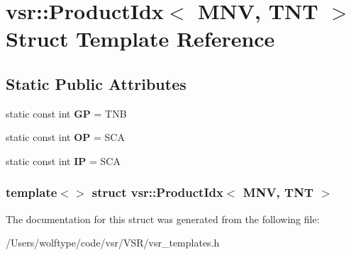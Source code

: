 \hypertarget{structvsr_1_1_product_idx_3_01_m_n_v_00_01_t_n_t_01_4}{\section{vsr\-:\-:Product\-Idx$<$ M\-N\-V, T\-N\-T $>$ Struct Template Reference}
\label{structvsr_1_1_product_idx_3_01_m_n_v_00_01_t_n_t_01_4}
}
\subsection*{Static Public Attributes}
\begin{DoxyCompactItemize}
\item 
\hypertarget{structvsr_1_1_product_idx_3_01_m_n_v_00_01_t_n_t_01_4_a0fd1d88e8059321bc475f995fc943346}{static const int {\bfseries G\-P} = T\-N\-B}\label{structvsr_1_1_product_idx_3_01_m_n_v_00_01_t_n_t_01_4_a0fd1d88e8059321bc475f995fc943346}

\item 
\hypertarget{structvsr_1_1_product_idx_3_01_m_n_v_00_01_t_n_t_01_4_aefcfd7a18fd88a99b57688c32b4f8682}{static const int {\bfseries O\-P} = S\-C\-A}\label{structvsr_1_1_product_idx_3_01_m_n_v_00_01_t_n_t_01_4_aefcfd7a18fd88a99b57688c32b4f8682}

\item 
\hypertarget{structvsr_1_1_product_idx_3_01_m_n_v_00_01_t_n_t_01_4_acfd8fe84c17f6bd3917d4642b39534e7}{static const int {\bfseries I\-P} = S\-C\-A}\label{structvsr_1_1_product_idx_3_01_m_n_v_00_01_t_n_t_01_4_acfd8fe84c17f6bd3917d4642b39534e7}

\end{DoxyCompactItemize}
\subsubsection*{template$<$$>$ struct vsr\-::\-Product\-Idx$<$ M\-N\-V, T\-N\-T $>$}



The documentation for this struct was generated from the following file\-:\begin{DoxyCompactItemize}
\item 
/\-Users/wolftype/code/vsr/\-V\-S\-R/vsr\-\_\-templates.\-h\end{DoxyCompactItemize}
